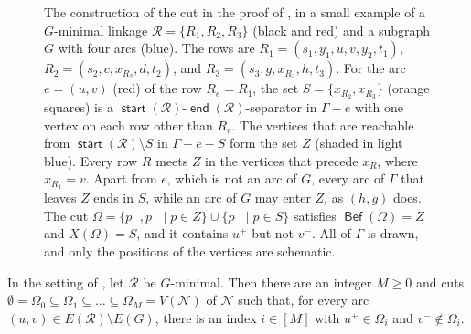 \documentclass[fontsize=12pt,leading=14pt]{fullpaper}
\DeclareMathOperator{\st}{\mathsf{start}}
\DeclareMathOperator{\en}{\mathsf{end}}
\DeclareMathOperator{\Bef}{\mathsf{Bef}}
\newcommand{\Ncal}{\mathcal{N}}
\newcommand{\Rcal}{\mathcal{R}}
\begin{document}
\begin{figure}[ht]
  \caption{The construction of the cut in the proof of , in a small example of a $G$-minimal linkage $\Rcal=\{R_1,R_2,R_3\}$ (black and red) and a subgraph $G$ with four arcs (blue).
    The rows are $R_1=(s_1,y_1,u,v,y_2,t_1)$, $R_2=(s_2,c,x_{R_2},d,t_2)$, and $R_3=(s_3,g,x_{R_3},h,t_3)$.
    For the arc $e=(u,v)$ (red) of the row $R_e=R_1$, the set $S=\{x_{R_2},x_{R_3}\}$ (orange squares) is a $\st(\Rcal)$-$\en(\Rcal)$-separator in $\Gamma-e$ with one vertex on each row other than $R_e$.
    The vertices that are reachable from $\st(\Rcal)\setminus S$ in $\Gamma-e-S$ form the set $Z$ (shaded in light blue).
    Every row $R$ meets $Z$ in the vertices that precede $x_R$, where $x_{R_1}=v$.
    Apart from $e$, which is not an arc of $G$, every arc of $\Gamma$ that leaves $Z$ ends in $S$, while an arc of $G$ may enter $Z$, as $(h,g)$ does.
    The cut $\Omega=\{p^-,p^+\mid p\in Z\}\cup\{p^-\mid p\in S\}$ satisfies $\Bef(\Omega)=Z$ and $X(\Omega)=S$, and it contains $u^+$ but not $v^-$.
  All of $\Gamma$ is drawn, and only the positions of the vertices are schematic.}
  \label{fig:separator-cut}
\end{figure}

\begin{lemma}\label{lem:chain-of-cuts}
  In the setting of , let $\Rcal$ be $G$-minimal.
  Then there are an integer $M\ge0$ and cuts $\emptyset=\Omega_0\subseteq\Omega_1\subseteq\dots\subseteq\Omega_M=V(\Ncal)$ of $\Ncal$ such that, for every arc $(u,v)\in E(\Rcal)\setminus E(G)$, there is an index $i\in[M]$ with $u^+\in\Omega_i$ and $v^-\notin\Omega_i$.
\end{lemma}
\end{document}
